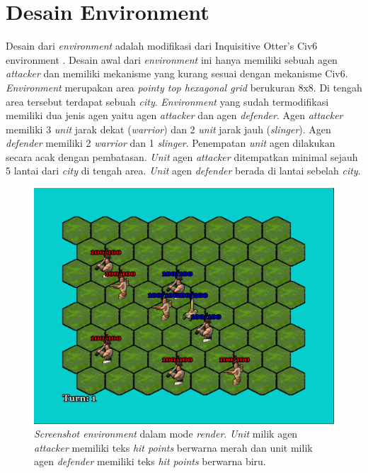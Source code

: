 \section{Desain Environment}
\label{sec:desainenvironment}

Desain dari \emph{environment} adalah modifikasi dari Inquisitive Otter's Civ6 environment \citep{civ6Environment}. 
Desain awal dari \emph{environment} ini hanya memiliki sebuah agen \emph{attacker} dan memiliki mekanisme yang kurang sesuai dengan mekanisme Civ6.
\emph{Environment} merupakan area \emph{pointy top hexagonal grid} berukuran 8x8. Di tengah area tersebut terdapat sebuah \emph{city}.
\emph{Environment} yang sudah termodifikasi memiliki dua jenis agen yaitu agen \emph{attacker} dan agen \emph{defender}.
Agen \emph{attacker} memiliki 3 \emph{unit} jarak dekat (\emph{warrior}) dan 2 \emph{unit} jarak jauh (\emph{slinger}).
Agen \emph{defender} memiliki 2 \emph{warrior} dan 1 \emph{slinger}.
Penempatan \emph{unit} agen dilakukan secara acak dengan pembatasan.
\emph{Unit} agen \emph{attacker} ditempatkan minimal sejauh 5 lantai dari \emph{city} di tengah area.
\emph{Unit} agen \emph{defender} berada di lantai sebelah \emph{city}.


\begin{figure}[H]
  \centering
    \includegraphics[scale=0.3]{gambar/environment_screenshot.png}
    \caption{\emph{Screenshot environment} dalam mode \emph{render}. \emph{Unit} milik agen \emph{attacker} memiliki teks \emph{hit points} berwarna merah dan unit milik agen \emph{defender} memiliki teks \emph{hit points} berwarna biru.}
    \label{fig:environmentScreenshot}
\end{figure}



